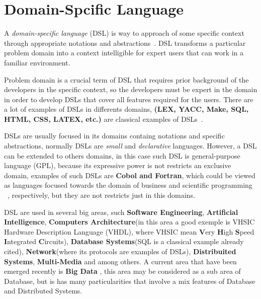 \chapter{Domain-Spcific Language} %
\label{cha:dls}

A \textit{domain-specific language} (DSL) is way to approach of some specific
context through appropriate notations and abstractions~\cite{deursen:2000}. DSL
transforms a particular problem domain into a context intelligible for expert
users that can work in a familiar environment.

Problem domain is a crucial term of DSL that requires prior background of the
developers in the specific context, so the developers must be expert in the domain
in order to develop DSLs that cover all features required for the users. There are
a lot of examples of DSLs in differents domains, \textbf{(LEX, YACC, Make, SQL,
HTML, CSS, LATEX, etc.)} are classical examples of DSLs~\cite{bentley:1986}.

DSLs are usually focused in its domains containg notations and specific abstractions,
normally DSLs are \textit{small} and \textit{declarative} languages. However, a
DSL can be extended to others	 domains, in this case such DSL is
general-purpose language (GPL), because its expressive power is not restricts
an exclusive domain, examples of such DSLs are \textbf{Cobol and Fortran}, which
could be viewed as languages focused towards the domain of business and scientific
programming  ~\cite{deursen:2000}, respectively, but they are not restricts just
in this domains.

DSL are used in several big areas, such \textbf{Software Engineering}, 
\textbf{Artificial Intelligence}, \textbf{Computers Architecture}(in this area a
good exemple is VHSIC Hardware Description Language (VHDL), where VHSIC mean 
{\bf V}ery {\bf H}igh {\bf S}peed {\bf I}ntegrated {\bf C}ircuits), \textbf{Database
Systems}(SQL is a classical example already cited), \textbf{Network}(where its
protocols are examples of DSLs), \textbf{Distribuited Systems}, \textbf{Multi-Media}
and among others. A current area that have been emerged recently is \textbf{Big Data}
, this area may be considered as a sub area of Database, but is has many
particularities that involve a mix features of Database and Distributed Systems.
